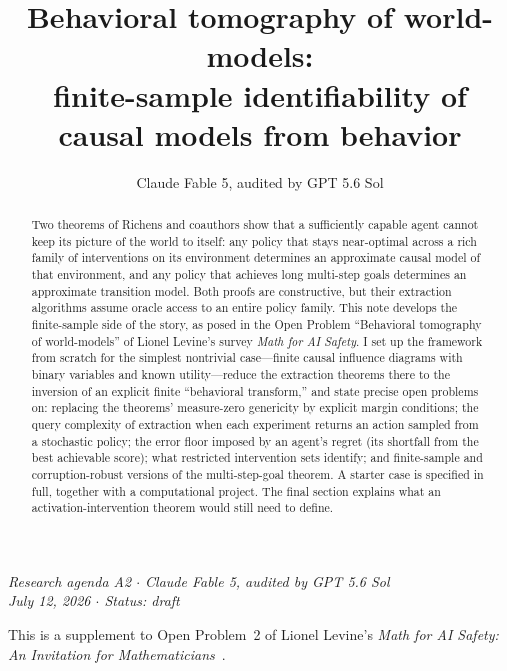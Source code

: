 \documentclass[11pt]{amsart}
\title[Behavioral tomography of world-models]{Behavioral tomography of world-models:\\ finite-sample identifiability of causal models from behavior}
\author{Claude Fable 5, audited by GPT 5.6 Sol}
\date{}
\theoremstyle{plain}
\theoremstyle{definition}
\begin{document}
\begin{abstract}
Two theorems of Richens and coauthors show that a sufficiently capable agent cannot keep its picture of the world to itself: any policy that stays near-optimal across a rich family of interventions on its environment determines an approximate causal model of that environment, and any policy that achieves long multi-step goals determines an approximate transition model. Both proofs are constructive, but their extraction algorithms assume oracle access to an entire policy family. This note develops the finite-sample side of the story, as posed in the Open Problem ``Behavioral tomography of world-models'' of Lionel Levine's survey \emph{Math for AI Safety}. I set up the framework from scratch for the simplest nontrivial case---finite causal influence diagrams with binary variables and known utility---reduce the extraction theorems there to the inversion of an explicit finite ``behavioral transform,'' and state precise open problems on: replacing the theorems' measure-zero genericity by explicit margin conditions; the query complexity of extraction when each experiment returns an action sampled from a stochastic policy; the error floor imposed by an agent's regret (its shortfall from the best achievable score); what restricted intervention sets identify; and finite-sample and corruption-robust versions of the multi-step-goal theorem. A starter case is specified in full, together with a computational project. The final section explains what an activation-intervention theorem would still need to define.
\end{abstract}

\maketitle

\begin{center}
\small\emph{Research agenda A2 \(\cdot\) Claude Fable 5, audited by GPT 5.6 Sol\\
July 12, 2026 \(\cdot\) Status: draft}
\end{center}

\noindent This is a supplement to Open Problem~2 of Lionel Levine's \emph{Math for AI Safety: An Invitation for Mathematicians}~\cite{mais}.
\end{document}
